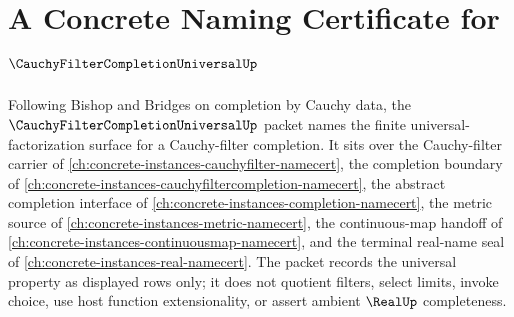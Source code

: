 \chapter{A Concrete Naming Certificate for $\CauchyFilterCompletionUniversalUp$}
\label{ch:concrete-instances-cauchy-filter-completion-universal-namecert}

Following Bishop and Bridges on completion by Cauchy data, the $\CauchyFilterCompletionUniversalUp$ packet names the finite universal-factorization surface for a Cauchy-filter completion. It sits over the Cauchy-filter carrier of \autoref{ch:concrete-instances-cauchyfilter-namecert}, the completion boundary of \autoref{ch:concrete-instances-cauchyfiltercompletion-namecert}, the abstract completion interface of \autoref{ch:concrete-instances-completion-namecert}, the metric source of \autoref{ch:concrete-instances-metric-namecert}, the continuous-map handoff of \autoref{ch:concrete-instances-continuousmap-namecert}, and the terminal real-name seal of \autoref{ch:concrete-instances-real-namecert}. The packet records the universal property as displayed rows only; it does not quotient filters, select limits, invoke choice, use host function extensionality, or assert ambient $\RealUp$ completeness.

